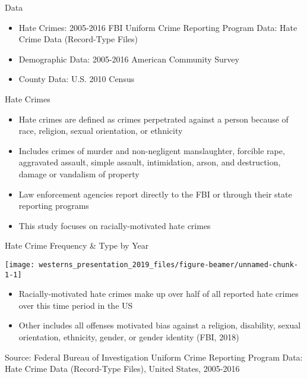 \documentclass[ignorenonframetext,]{beamer}
\providecommand{\tightlist}{%
  \setlength{\itemsep}{0pt}\setlength{\parskip}{0pt}}
\begin{document}
\begin{frame}{Data}

\begin{itemize}
\tightlist
\item
  Hate Crimes: 2005-2016 FBI Uniform Crime Reporting Program Data: Hate
  Crime Data (Record-Type Files)
\item
  Demographic Data: 2005-2016 American Community Survey
\item
  County Data: U.S. 2010 Census
\end{itemize}

\end{frame}

\begin{frame}{Hate Crimes}

\begin{itemize}
\tightlist
\item
  Hate crimes are defined as crimes perpetrated against a person because
  of race, religion, sexual orientation, or ethnicity
\item
  Includes crimes of murder and non-negligent manslaughter, forcible
  rape, aggravated assault, simple assault, intimidation, arson, and
  destruction, damage or vandalism of property
\item
  Law enforcement agencies report directly to the FBI or through their
  state reporting programs
\item
  This study focuses on racially-motivated hate crimes
\end{itemize}

\end{frame}

\begin{frame}{Hate Crime Frequency \& Type by Year}

\texttt{[image: westerns\_presentation\_2019\_files/figure-beamer/unnamed-chunk-1-1]}
\small{
\begin{itemize}
  \item Racially-motivated hate crimes make up over half of all reported hate crimes over this time period in the US
  \item Other includes all offenses motivated bias against a religion, disability, sexual orientation, ethnicity, gender, or gender identity (FBI, 2018)
\end{itemize}}

\tiny{Source: Federal Bureau of Investigation Uniform Crime Reporting Program Data: Hate Crime Data (Record-Type Files), United States, 2005-2016}

\end{frame}
\end{document}
